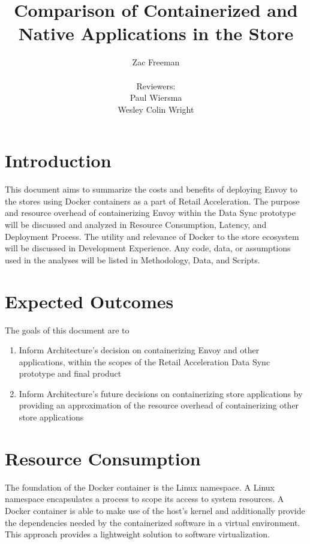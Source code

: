 \documentclass{article}
\begin{document}
\title{Comparison of Containerized and Native Applications in the Store}
\author{Zac Freeman\\\\Reviewers:\\Paul Wiersma\\ Wesley Colin Wright}

\maketitle

\section{Introduction}
This document aims to summarize the costs and benefits of deploying Envoy to the stores using Docker containers as a part of Retail Acceleration. The purpose and resource overhead of containerizing Envoy within the Data Sync prototype will be discussed and analyzed in Resource Consumption, Latency, and Deployment Process. The utility and relevance of Docker to the store ecosystem will be discussed in Development Experience. Any code, data, or assumptions used in the analyses will be listed in Methodology, Data, and Scripts.

\section{Expected Outcomes}
The goals of this document are to
\begin{enumerate}
    \item Inform Architecture's decision on containerizing Envoy and other applications, within the scopes of the Retail Acceleration Data Sync prototype and final product
    \item Inform Architecture's future decisions on containerizing store applications by providing an approximation of the resource overhead of containerizing other store applications
\end{enumerate}

\section{Resource Consumption}
The foundation of the Docker container is the Linux namespace. A Linux namespace encapsulates a process to scope its access to system resources. A Docker container is able to make use of the host's kernel and additionally provide the dependencies needed by the containerized software in a virtual environment. This approach provides a lightweight solution to software virtualization.
\end{document}
